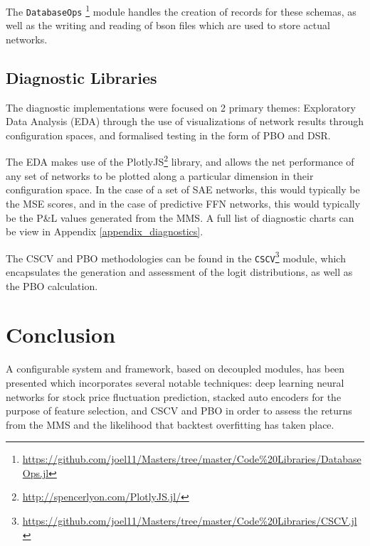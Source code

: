 \documentclass[a4paper,11pt,oneside]{article}
\theoremstyle{plain}
\theoremstyle{definition}
\begin{document}
The \texttt{DatabaseOps} \footnote{\url{https://github.com/joel11/Masters/tree/master/Code\%20Libraries/DatabaseOps.jl}} module handles the creation of records for these schemas, as well as the writing and reading of bson files which are used to store actual networks.

\subsection{Diagnostic Libraries}

The diagnostic implementations were focused on 2 primary themes: Exploratory Data Analysis (EDA) through the use of visualizations of network results through configuration spaces, and formalised testing in the form of PBO and DSR.

The EDA makes use of the PlotlyJS\footnote{\url{http://spencerlyon.com/PlotlyJS.jl/}} library, and allows the net performance of any set of networks to be plotted along a particular dimension in their configuration space. In the case of a set of SAE networks, this would typically be the MSE scores, and in the case of predictive FFN networks, this would typically be the P\&L values generated from the MMS. A full list of diagnostic charts can be view in Appendix \ref{appendix_diagnostics}. \newline

The CSCV and PBO methodologies can be found in the \texttt{CSCV}\footnote{\url{https://github.com/joel11/Masters/tree/master/Code\%20Libraries/CSCV.jl}} module, which encapsulates the generation and assessment of the logit distributions, as well as the PBO calculation.


\newpage
\section{Conclusion}\label{Conclusion}

A configurable system and framework, based on decoupled modules, has been presented which incorporates several notable techniques: deep learning neural networks for stock price fluctuation prediction, stacked auto encoders for the purpose of feature selection, and CSCV and PBO in order to assess the returns from the MMS and the likelihood that backtest overfitting has taken place. \newline 
\end{document}
